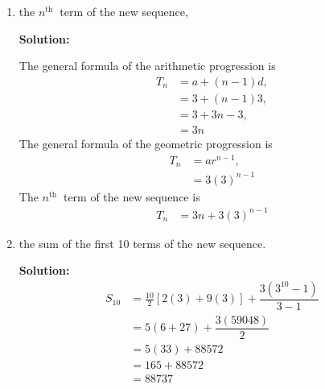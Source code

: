 \documentclass{report}
\newcommand{\sol}{\textbf{Solution:}}
\begin{document}
\begin{enumerate}[leftmargin=*]
\begin{enumerate}
                    \sol{}

                    The first four terms of the new sequence are
                    \begin{align*}
                        T_1 & =(1\times 3) + (3^1) = 3+3=6,   \\
                        T_2 & =(2\times 3) + (3^2) = 6+9=15,  \\
                        T_3 & =(3\times 3) + (3^3) = 9+27=36, \\
                        T_4 & =(4\times 3) + (3^4) = 12+81=93
                    \end{align*}

                    \newpage
              \item the $n^{\text {th }}$ term of the new sequence,

                    \sol{}

                    The general formula of the arithmetic progression is
                    \begin{align*}
                        T_n & =a+(n-1)d,  \\
                            & = 3+(n-1)3, \\
                            & = 3+3n-3,   \\
                            & = 3n
                    \end{align*}
                    The general formula of the geometric progression is
                    \begin{align*}
                        T_n & =ar^{n-1},  \\
                            & =3(3)^{n-1}
                    \end{align*}
                    The $n^{\text {th }}$ term of the new sequence is
                    \begin{align*}
                        T_n & =3n+3(3)^{n-1}
                    \end{align*}

              \item the sum of the first 10 terms of the new sequence.

                    \sol{}
                    \begin{align*}
                        S_{10} & =\frac{10}{2}\left[2(3) + 9(3)\right] + \dfrac{3(3^{10}-1)}{3-1} \\
                               & =5(6+27) + \dfrac{3(59048)}{2}                                   \\
                               & =5(33) + 88572                                                   \\
                               & =165 + 88572                                                     \\
                               & =88737
                    \end{align*}
          \end{enumerate}


\end{enumerate}
\end{document}
